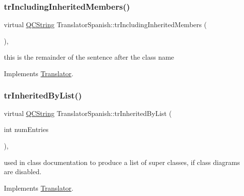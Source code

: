 \mbox{\label{class_translator_spanish_ae4d06420c39ed2c65dd70727772b3650}} 
\subsubsection{\texorpdfstring{trIncludingInheritedMembers()}{trIncludingInheritedMembers()}}
{\footnotesize\ttfamily virtual \mbox{\hyperlink{class_q_c_string}{Q\+C\+String}} Translator\+Spanish\+::tr\+Including\+Inherited\+Members (\begin{DoxyParamCaption}{ }\end{DoxyParamCaption})\hspace{0.3cm}{\ttfamily [inline]}, {\ttfamily [virtual]}}

this is the remainder of the sentence after the class name 

Implements \mbox{\hyperlink{class_translator}{Translator}}.

\mbox{\label{class_translator_spanish_a2b54b745c3c4e80f86e38352000b1e49}} 
\subsubsection{\texorpdfstring{trInheritedByList()}{trInheritedByList()}}
{\footnotesize\ttfamily virtual \mbox{\hyperlink{class_q_c_string}{Q\+C\+String}} Translator\+Spanish\+::tr\+Inherited\+By\+List (\begin{DoxyParamCaption}\item[{int}]{num\+Entries }\end{DoxyParamCaption})\hspace{0.3cm}{\ttfamily [inline]}, {\ttfamily [virtual]}}

used in class documentation to produce a list of super classes, if class diagrams are disabled. 

Implements \mbox{\hyperlink{class_translator}{Translator}}.

\mbox{\label{class_translator_spanish_a1fea6d28d8bc42d2c9af0ecb561938b0}} 
